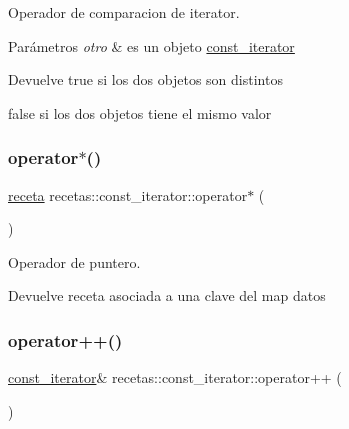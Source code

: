Operador de comparacion de iterator. 


\begin{DoxyParams}{Parámetros}
{\em otro} & es un objeto \hyperlink{classrecetas_1_1const__iterator}{const\+\_\+iterator} \\
\hline
\end{DoxyParams}
\begin{DoxyReturn}{Devuelve}
true si los dos objetos son distintos 

false si los dos objetos tiene el mismo valor 
\end{DoxyReturn}
\mbox{\label{classrecetas_1_1const__iterator_a006a4603e352bd21e5458980536d9d8a}} 
\subsubsection{\texorpdfstring{operator$\ast$()}{operator*()}}
{\footnotesize\ttfamily \hyperlink{classreceta}{receta} recetas\+::const\+\_\+iterator\+::operator$\ast$ (\begin{DoxyParamCaption}{ }\end{DoxyParamCaption})}



Operador de puntero. 

\begin{DoxyReturn}{Devuelve}
receta asociada a una clave del map datos 
\end{DoxyReturn}
\mbox{\label{classrecetas_1_1const__iterator_aa9abcd68d74907b2483d2a7f8bb546af}} 
\subsubsection{\texorpdfstring{operator++()}{operator++()}}
{\footnotesize\ttfamily \hyperlink{classrecetas_1_1const__iterator}{const\+\_\+iterator}\& recetas\+::const\+\_\+iterator\+::operator++ (\begin{DoxyParamCaption}{ }\end{DoxyParamCaption})}



